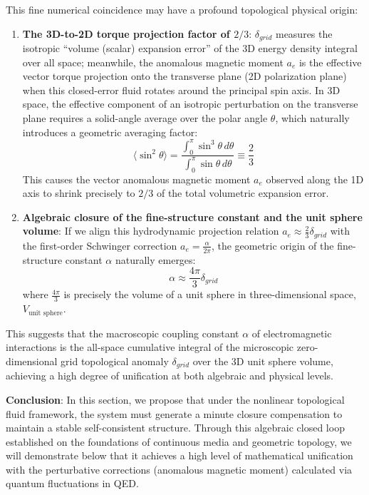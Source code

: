 \documentclass[12pt, a4paper]{article}
\begin{document}
This fine numerical coincidence may have a profound topological physical origin:
\begin{enumerate}
    \item \textbf{The 3D-to-2D torque projection factor of $2/3$}: $\delta_{grid}$ measures the isotropic ``volume (scalar) expansion error'' of the 3D energy density integral over all space; meanwhile, the anomalous magnetic moment $a_e$ is the effective vector torque projection onto the transverse plane (2D polarization plane) when this closed-error fluid rotates around the principal spin axis. In 3D space, the effective component of an isotropic perturbation on the transverse plane requires a solid-angle average over the polar angle $\theta$, which naturally introduces a geometric averaging factor:
    \begin{equation}
    \langle \sin^2\theta \rangle = \frac{\int_0^\pi \sin^3\theta \, d\theta}{\int_0^\pi \sin\theta \, d\theta} \equiv \frac{2}{3}
    \end{equation}
    This causes the vector anomalous magnetic moment $a_e$ observed along the 1D axis to shrink precisely to $2/3$ of the total volumetric expansion error.
    
    \item \textbf{Algebraic closure of the fine-structure constant and the unit sphere volume}: If we align this hydrodynamic projection relation $a_e \approx \frac{2}{3}\delta_{grid}$ with the first-order Schwinger correction $a_e = \frac{\alpha}{2\pi}$, the geometric origin of the fine-structure constant $\alpha$ naturally emerges:
    \begin{equation}
    \alpha \approx \frac{4\pi}{3} \delta_{grid}
    \end{equation}
    where $\frac{4\pi}{3}$ is precisely the volume of a unit sphere in three-dimensional space, $V_{\text{unit sphere}}$.
\end{enumerate}
This suggests that the macroscopic coupling constant $\alpha$ of electromagnetic interactions is the all-space cumulative integral of the microscopic zero-dimensional grid topological anomaly $\delta_{grid}$ over the 3D unit sphere volume, achieving a high degree of unification at both algebraic and physical levels.

\textbf{Conclusion}: In this section, we propose that under the nonlinear topological fluid framework, the system must generate a minute closure compensation to maintain a stable self-consistent structure. Through this algebraic closed loop established on the foundations of continuous media and geometric topology, we will demonstrate below that it achieves a high level of mathematical unification with the perturbative corrections (anomalous magnetic moment) calculated via quantum fluctuations in QED.
\end{document}
